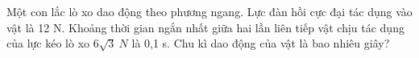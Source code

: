 \begin{ex} %
Một con lắc lò xo dao động theo phương ngang. Lực đàn hồi cực đại tác dụng vào vật là 12 N. Khoảng thời gian ngắn nhất giữa hai lần liên tiếp vật chịu tác dụng của lực kéo lò xo $6\sqrt{3}\ N$ là 0,1 s. Chu kì dao động của vật là bao nhiêu giây?
\end{ex} 